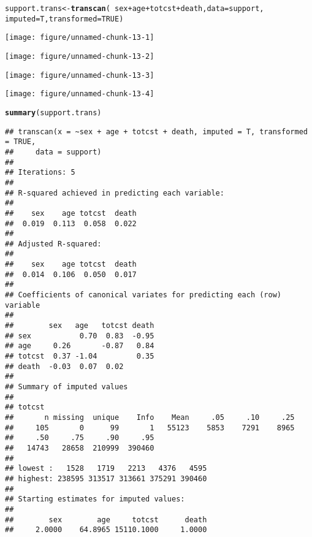 \documentclass[headinclude=true, headsepline=true, DIV14]{scrartcl}\usepackage[]{graphicx}\usepackage[]{color}
\makeatletter
\def\maxwidth{ %
  \ifdim\Gin@nat@width>\linewidth
    \linewidth
  \else
    \Gin@nat@width
  \fi
}
\newcommand{\hlnum}[1]{\textcolor[rgb]{0.686,0.059,0.569}{#1}}%
\newcommand{\hlopt}[1]{\textcolor[rgb]{0,0,0}{#1}}%
\newcommand{\hlstd}[1]{\textcolor[rgb]{0.345,0.345,0.345}{#1}}%
\newcommand{\hlkwb}[1]{\textcolor[rgb]{0.69,0.353,0.396}{#1}}%
\newcommand{\hlkwc}[1]{\textcolor[rgb]{0.333,0.667,0.333}{#1}}%
\newcommand{\hlkwd}[1]{\textcolor[rgb]{0.737,0.353,0.396}{\textbf{#1}}}%
\newenvironment{kframe}{%
 \def\at@end@of@kframe{}%
 \ifinner\ifhmode%
  \def\at@end@of@kframe{\end{minipage}}%
  \begin{minipage}{\columnwidth}%
 \fi\fi%
 \def\FrameCommand##1{\hskip\@totalleftmargin \hskip-\fboxsep
 \colorbox{shadecolor}{##1}\hskip-\fboxsep
     \hskip-\linewidth \hskip-\@totalleftmargin \hskip\columnwidth}%
 \MakeFramed {\advance\hsize-\width
   \@totalleftmargin\z@ \linewidth\hsize
   \@setminipage}}%
 {\par\unskip\endMakeFramed%
 \at@end@of@kframe}
\newenvironment{knitrout}{}{} %
\makeatother
\begin{document}
\begin{knitrout}
\color{fgcolor}\begin{kframe}
\begin{alltt}
\hlstd{support.trans} \hlkwb{<-} \hlkwd{transcan}\hlstd{(}\hlopt{~} \hlstd{sex} \hlopt{+} \hlstd{age} \hlopt{+} \hlstd{totcst} \hlopt{+} \hlstd{death,} \hlkwc{data} \hlstd{= support,}
                          \hlkwc{imputed} \hlstd{= T,} \hlkwc{transformed}\hlstd{=}\hlnum{TRUE}\hlstd{)}
\end{alltt}
\end{kframe}

{\centering \texttt{[image: figure/unnamed-chunk-13-1]} 

}




{\centering \texttt{[image: figure/unnamed-chunk-13-2]} 

}




{\centering \texttt{[image: figure/unnamed-chunk-13-3]} 

}




{\centering \texttt{[image: figure/unnamed-chunk-13-4]} 

}



\end{knitrout}
\begin{knitrout}
\color{fgcolor}\begin{kframe}
\begin{alltt}
\hlkwd{summary}\hlstd{(support.trans)}
\end{alltt}
\begin{verbatim}
## transcan(x = ~sex + age + totcst + death, imputed = T, transformed = TRUE, 
##     data = support)
## 
## Iterations: 5 
## 
## R-squared achieved in predicting each variable:
## 
##    sex    age totcst  death 
##  0.019  0.113  0.058  0.022 
## 
## Adjusted R-squared:
## 
##    sex    age totcst  death 
##  0.014  0.106  0.050  0.017 
## 
## Coefficients of canonical variates for predicting each (row) variable
## 
##        sex   age   totcst death
## sex           0.70  0.83  -0.95
## age     0.26       -0.87   0.84
## totcst  0.37 -1.04         0.35
## death  -0.03  0.07  0.02       
## 
## Summary of imputed values
## 
## totcst 
##       n missing  unique    Info    Mean     .05     .10     .25 
##     105       0      99       1   55123    5853    7291    8965 
##     .50     .75     .90     .95 
##   14743   28658  210999  390460 
## 
## lowest :   1528   1719   2213   4376   4595
## highest: 238595 313517 313661 375291 390460 
## 
## Starting estimates for imputed values:
## 
##        sex        age     totcst      death 
##     2.0000    64.8965 15110.1000     1.0000
\end{verbatim}
\end{kframe}
\end{knitrout}
\end{document}
